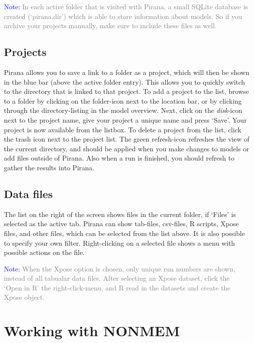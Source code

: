 {\vspace{8pt}
\noindent
\scriptsize{
\textcolor{Blue}{Note:} \textcolor{Grey}{In each active folder that
    is visited with Pirana, a small SQLite database is created
    (`pirana.dir') which is able to store information about models. So
    if you archive your projects manually, make sure to include these files as
    well.  }
}
\normalsize

\subsection{Projects} Pirana allows you to save a link to a folder as
a project, which will then be shown in the blue bar (above the active folder
entry). This allows you to quickly switch to the directory that is
linked to that project. To add a project to the list, browse to a
folder by clicking on the folder-icon next to the location bar, or by
clicking through the directory-listing in the model overview. Next,
click on the \textit{disk}-icon next to the project name, give your
project a unique name and press `Save'. Your project is now available
from the listbox. To delete a project from the list, click the trash
icon next to the project list. The green refresh-icon refreshes the
view of the current directory, and should be applied when you make
changes to models or add files outside of Pirana. Also when a run is
finished, you should refresh to gather the results into Pirana.


\subsection{Data files} The list on the right of the screen shows
files in the current folder, if `Files' is selected as the active tab. Pirana can show tab-files, csv-files, R scripts, Xpose files, and other files, which can be selected from the list above. It is also possible to specify your own
filter. Right-clicking on a selected file shows a menu with possible
actions on the file.

\vspace{8pt}
\noindent\scriptsize{\textcolor{Blue}{Note:} \textcolor{Grey}{When the
    Xpose option is chosen, only unique run numbers are shown, instead
    of all tabualar data files. After selecting an Xpose dataset,
    click the `Open in R' the right-click-menu, and R read in the
    datasets and create the Xpose object.  } \normalsize

\section{Working with NONMEM}

}}
